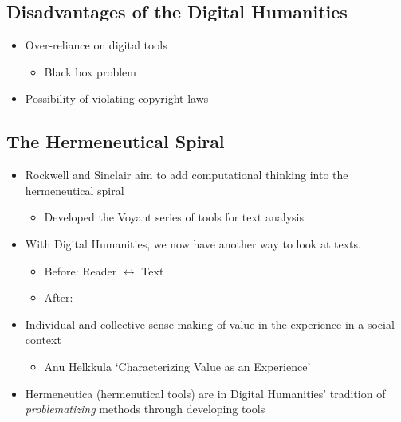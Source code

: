 \documentclass[a4paper]{article}
\begin{document}
\subsection{Disadvantages of the Digital Humanities}
\begin{itemize}
    \item Over-reliance on digital tools
    \begin{itemize}[label=$\circ$]
        \item Black box problem
    \end{itemize}
    \item Possibility of violating copyright laws
\end{itemize}
\subsection{The Hermeneutical Spiral}
\begin{itemize}
    \item Rockwell and Sinclair aim to add computational thinking into the hermeneutical spiral
    \begin{itemize}
        \item Developed the Voyant series of tools for text analysis
    \end{itemize}
    \item With Digital Humanities, we now have another way to look at texts.
    \begin{itemize}[label=$\circ$]
        \item Before: Reader $\longleftrightarrow$ Text
        \item After: 
    \end{itemize}
        \item Individual and collective sense-making of value in the experience in a social context
        \begin{itemize}[label=$\circ$]
            \item Anu Helkkula `Characterizing Value as an Experience'
        \end{itemize}
        \item Hermeneutica (hermenutical tools) are in Digital Humanities' tradition of \textit{problematizing} methods through developing tools
\end{itemize}
\end{document}
